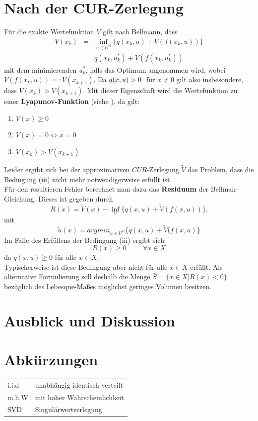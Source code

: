 \documentclass[12pt,a4paper,twoside]{article}
\begin{document}
\section{Nach der CUR-Zerlegung}
	Für die exakte Wertefunktion $V$ gilt nach Bellmann, dass
	\begin{eqnarray*}
		V(x_k)&=&\inf_{u\in U^{\mathds{N}}}\{q(x_k,u)+V(f(x_k,u))\} \\
			&=&q(x_k,u_k^*)+V(f(x_k,u_k^*))
	\end{eqnarray*}
	mit dem minimierenden $u_k^*$, falls das Optimum angenommen wird, wobei $V(f(x_k,u))=:V(x_{k+1})$. Da $q(x,u)>0 \hspace{1mm}$ für $x\neq 0$ gilt also insbesondere, dass $V(x_k)>V(x_{k+1})$. \newline
	\newline
	Mit dieser Eigenschaft wird die Wertefunktion zu einer \textbf{Lyapunov-Funktion} (siehe \citep{Wiggins1990}), da gilt:
	\begin{enumerate}
		\item $V(x)\geq 0$ 
		\item $V(x)=0 \Leftrightarrow x=0$
		\item $V(x_k)>V(x_{k+1})$
	\end{enumerate}
	Leider ergibt sich bei der approximativen $CUR$-Zerlegung $\tilde{V}$ das Problem, dass die Bedingung (iii) nicht 
	mehr notwendigerweise erfüllt ist. \\
	Für den resultieren Fehler berechnet man dazu das \textbf{Residuum} der Bellman-Gleichung. Dieses ist gegeben 
	durch
	\begin{equation}
		R(x)=\tilde{V}(x)-\inf_{u}\{q(x,u)+\tilde{V}(f(x,u))\}.
	\end{equation}
	mit
	\begin{equation}
		\tilde{u}(x)=argmin_{u\in U^{\mathds{N}}}\{q(x,u)+\tilde{V}(f(x,u)\}
	\end{equation}
	Im Falle des Erfüllens der Bedingung (iii) ergibt sich
	\begin{equation}
		R(x)\geq 0 \hspace{1cm}\forall x\in X
	\end{equation}
	da $q(x,u)\geq0$ für alle $x\in X$. \\
	Typischerweise ist diese Bedingung aber nicht für alle $x\in X$ erfüllt. Als alternative Formulierung soll 
	deshalb die Menge $\bar{S}=\{x\in X| R(x)<0\}$ bezüglich des Lebesque-Maßes möglichst geringes Volumen besitzen.
\section{Ausblick und Diskussion}
	\newpage
\section*{Abkürzungen}
	\begin{tabular}{ll}
		i.i.d & unabhängig identisch verteilt \\
		m.h.W & mit hoher Wahrscheinlichkeit\\
		SVD & Singulärwertzerlegung \\
	\end{tabular}
	\newpage

\end{document}
